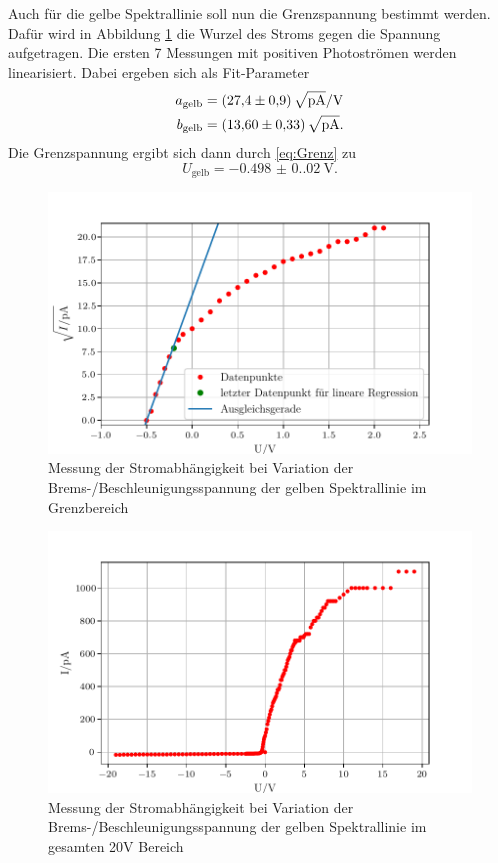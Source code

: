 \noindent Auch für die gelbe Spektrallinie soll nun die Grenzspannung bestimmt werden. Dafür wird in Abbildung \ref{fig:gelb}
die Wurzel des Stroms gegen die Spannung aufgetragen. Die ersten 7 Messungen mit positiven Photoströmen werden linearisiert.
Dabei ergeben sich als Fit-Parameter
\begin{align*}
  a_\text{gelb}&=\qty{27.4(0.9)}{\sqrt{\pico\ampere}\per\volt}\\
  b_\text{gelb}&=\qty{13.6(0.33)}{\sqrt{\pico\ampere}}.\\
\end{align*}
Die Grenzspannung ergibt sich dann durch \eqref{eq:Grenz} zu
\begin{equation*}
  U_\text{gelb}=\qty{-0.498(0.020)}{\volt}.
\end{equation*}
\begin{figure}[H]
  \centering
  \includegraphics{content/gelb.pdf}
  \caption{Messung der Stromabhängigkeit bei Variation der Brems-/Beschleunigungsspannung der gelben Spektrallinie im Grenzbereich}
  \label{fig:gelb}
\end{figure}
\begin{figure}[H]
  \centering
  \includegraphics{content/Allgelb.pdf}
  \caption{Messung der Stromabhängigkeit bei Variation der Brems-/Beschleunigungsspannung der gelben Spektrallinie im gesamten 20V Bereich}
  \label{fig:Allgelb}
\end{figure}
